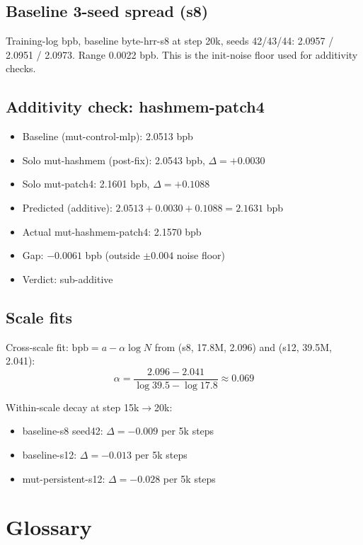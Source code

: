 \documentclass[11pt,openany]{book}
\begin{document}
\section{Baseline 3-seed spread (s8)}

Training-log bpb, baseline byte-hrr-s8 at step 20k, seeds 42/43/44:
2.0957 / 2.0951 / 2.0973. Range 0.0022 bpb. This is the
init-noise floor used for additivity checks.

\section{Additivity check: hashmem-patch4}

\begin{itemize}
  \item Baseline (mut-control-mlp): 2.0513 bpb
  \item Solo mut-hashmem (post-fix): 2.0543 bpb, $\Delta = +0.0030$
  \item Solo mut-patch4: 2.1601 bpb, $\Delta = +0.1088$
  \item Predicted (additive): $2.0513 + 0.0030 + 0.1088 = 2.1631$ bpb
  \item Actual mut-hashmem-patch4: 2.1570 bpb
  \item Gap: $-0.0061$ bpb (outside $\pm 0.004$ noise floor)
  \item Verdict: sub-additive
\end{itemize}

\section{Scale fits}

Cross-scale fit: $\mathrm{bpb} = a - \alpha \log N$ from (s8, 17.8M,
2.096) and (s12, 39.5M, 2.041):
\[
\alpha = \frac{2.096 - 2.041}{\log 39.5 - \log 17.8} \approx 0.069
\]

Within-scale decay at step 15k$\to$20k:
\begin{itemize}
  \item baseline-s8 seed42: $\Delta = -0.009$ per 5k steps
  \item baseline-s12: $\Delta = -0.013$ per 5k steps
  \item mut-persistent-s12: $\Delta = -0.028$ per 5k steps
\end{itemize}

\chapter{Glossary}
\end{document}

